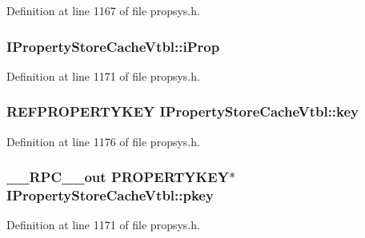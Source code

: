 Definition at line 1167 of file propsys.\+h.

\subsubsection[{\texorpdfstring{i\+Prop}{iProp}}]{ I\+Property\+Store\+Cache\+Vtbl\+::i\+Prop}\hypertarget{struct_i_property_store_cache_vtbl_a6aa3c42f49fad897426883183212beda}{}\label{struct_i_property_store_cache_vtbl_a6aa3c42f49fad897426883183212beda}


Definition at line 1171 of file propsys.\+h.

\subsubsection[{\texorpdfstring{key}{key}}]{ {\bf R\+E\+F\+P\+R\+O\+P\+E\+R\+T\+Y\+K\+EY} I\+Property\+Store\+Cache\+Vtbl\+::key}\hypertarget{struct_i_property_store_cache_vtbl_a628d05cf6b8ab9a773234a515ef01a13}{}\label{struct_i_property_store_cache_vtbl_a628d05cf6b8ab9a773234a515ef01a13}


Definition at line 1176 of file propsys.\+h.

\subsubsection[{\texorpdfstring{pkey}{pkey}}]{ {\bf \+\_\+\+\_\+\+R\+P\+C\+\_\+\+\_\+out} {\bf P\+R\+O\+P\+E\+R\+T\+Y\+K\+EY}$\ast$ I\+Property\+Store\+Cache\+Vtbl\+::pkey}\hypertarget{struct_i_property_store_cache_vtbl_ac908a8738f7ca790f5328d5fd978b63b}{}\label{struct_i_property_store_cache_vtbl_ac908a8738f7ca790f5328d5fd978b63b}


Definition at line 1171 of file propsys.\+h.

